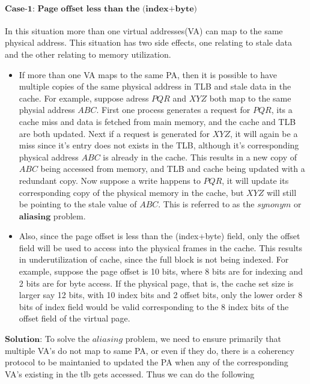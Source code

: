 \documentclass{tufte-handout}
\begin{document}
		\paragraph{$\textbf{Case-1: Page offset less than the (index+byte)}$}
			In this situation more than one virtual addresses(VA) can map to the same physical address. This situation has two side effects, one relating to stale data and the other relating to memory utilization.
			\begin{itemize}
				\item If more than one VA maps to the same PA, then it is possible to have multiple copies of the same physical address in TLB and stale data in the cache. For example, suppose adress $PQR$ and $XYZ$ both map to the same physial address $ABC$. First one process generates a request for $PQR$, its a cache miss and data is fetched from main memory, and the cache and TLB are both updated. Next if a request is generated for $XYZ$, it will again be a miss since it's entry does not exists in the TLB, although it's corresponding physical address $ABC$ is already in the cache. This results in a new copy of $ABC$ being accessed from memory, and TLB and cache being updated with a redundant copy. Now suppose a write happens to $PQR$, it will update its corresponding copy of the physical memory in the cache, but $XYZ$ will still be pointing to the stale value of $ABC$. This is referred to as the $synonym$ or $\textbf{aliasing}$ problem.
				\item Also, since the page offset is less than the (index+byte) field, only the offset field will be used to access into the physical frames in the cache. This results in underutilization of cache, since the full block is not being indexed. For example, suppose the page offset is 10 bits, where 8 bits are for indexing and 2 bits are for byte access. If the physical page, that is, the cache set size is larger say 12 bits, with 10 index bits and 2 offset bits, only the lower order 8 bits of index field would be valid corresponding to the 8 index bits of the offset field of the virtual page.
			\end{itemize}
			$\textbf{Solution:}$ To solve the $aliasing$ problem, we need to ensure primarily that multiple VA's do not map to same PA, or even if they do, there is a coherency protocol to be maintanied to updated the PA when any of the corresponding VA's existing in the tlb gets accessed. Thus we can do the following
\end{document}
